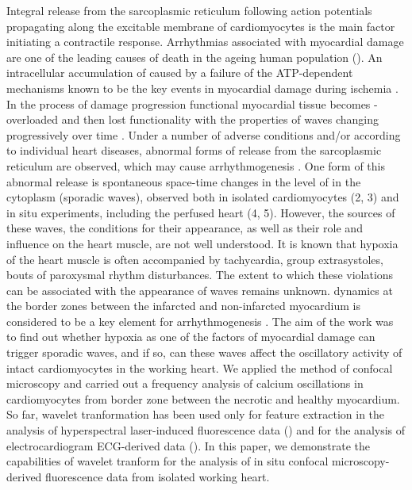 \documentclass{biophys-new}
\begin{document}
Integral  release from the sarcoplasmic reticulum following action potentials propagating along the excitable membrane of cardiomyocytes is the main factor initiating a contractile response.
Arrhythmias associated with myocardial damage are one of the leading causes of death in the ageing human population (\cite{xiao2011cardiac}).
An intracellular accumulation of  caused by a failure of the ATP-dependent mechanisms known to be the key events in myocardial damage during ischemia \cite{shen1972myocardial,shen1972kinetics,nayler1981role}.
In the process of damage progression functional myocardial tissue becomes -overloaded and then lost functionality with the properties of  waves changing progressively over time \cite{minamikawa1997situ,hama1998real}.
Under a number of adverse conditions and/or according to individual heart diseases, abnormal forms of  release from the sarcoplasmic reticulum are observed, which may cause arrhythmogenesis \cite{ishide1990propagation}.
One form of this abnormal release is spontaneous space-time changes in the level of  in the cytoplasm (sporadic  waves), observed both in isolated cardiomyocytes (2, 3) and in situ experiments, including the perfused heart (4, 5).
However, the sources of these waves, the conditions for their appearance, as well as their role and influence on the heart muscle, are not well understood.
It is known that hypoxia of the heart muscle is often accompanied by tachycardia, group extrasystoles, bouts of paroxysmal rhythm disturbances.
The extent to which these violations can be associated with the appearance of  waves remains unknown.
 dynamics at the border zones between the infarcted and non-infarcted myocardium is considered to be a key element for arrhythmogenesis \cite{takamatsu2008arrhythmogenic}.
The aim of the work was to find out whether hypoxia as one of the factors of myocardial damage can trigger sporadic  waves, and if so, can these waves affect the oscillatory activity of intact cardiomyocytes in the working heart.
We applied the method of confocal microscopy and carried out a frequency analysis of calcium oscillations in cardiomyocytes from border zone between the necrotic and healthy myocardium.
So far, wavelet tranformation has been used only for feature extraction in the analysis of hyperspectral laser-induced fluorescence data (\cite{sobolev2013application}) and for the analysis of electrocardiogram ECG-derived data (\cite{sharma2017use}).
In this paper, we demonstrate the capabilities of wavelet tranform for the analysis of in situ confocal microscopy-derived fluorescence data from isolated working heart.
\end{document}
